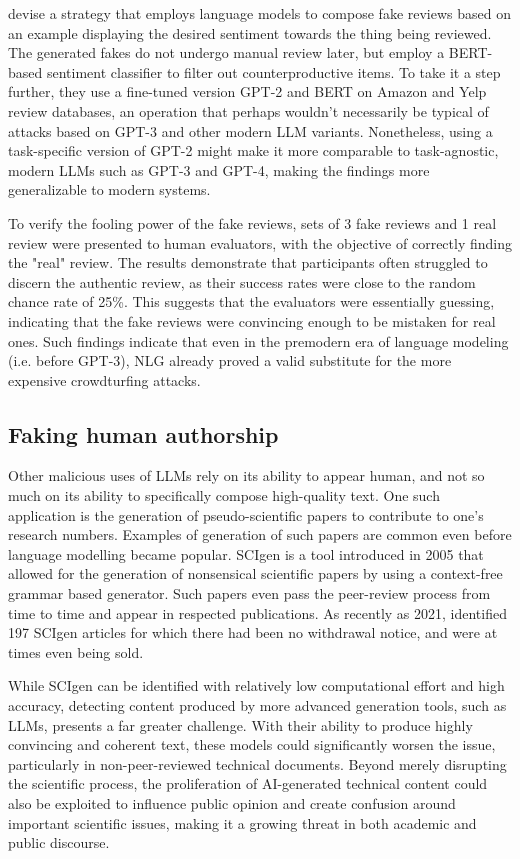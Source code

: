\citet{adelani2019reviews} devise a strategy that employs language models to compose fake reviews based on an example displaying the desired sentiment towards the thing being reviewed.
The generated fakes do not undergo manual review later, but employ a BERT-based sentiment classifier to filter out counterproductive items.
To take it a step further, they use a fine-tuned version GPT-2 and BERT on Amazon and Yelp review databases, an operation that perhaps wouldn't necessarily be typical of attacks based on GPT-3 and other modern LLM variants.
Nonetheless, using a task-specific version of GPT-2 might make it more comparable to task-agnostic, modern LLMs such as GPT-3 and GPT-4, making the findings more generalizable to modern systems.

To verify the fooling power of the fake reviews, sets of 3 fake reviews and 1 real review were presented to human evaluators, with the objective of correctly finding the "real" review.
The results demonstrate that participants often struggled to discern the authentic review, as their success rates were close to the random chance rate of 25\%.
This suggests that the evaluators were essentially guessing, indicating that the fake reviews were convincing enough to be mistaken for real ones.
Such findings indicate that even in the premodern era of language modeling (i.e. before GPT-3), NLG already proved a valid substitute for the more expensive crowdturfing attacks.

\subsection{Faking human authorship}

Other malicious uses of LLMs rely on its ability to appear human, and not so much on its ability to specifically compose high-quality text.
One such application is the generation of pseudo-scientific papers to contribute to one's research numbers.
Examples of generation of such papers are common even before language modelling became popular.
SCIgen \citep{hargrave2005scigen} is a tool introduced in 2005 that allowed for the generation of nonsensical scientific papers by using a context-free grammar based generator.
Such papers even pass the peer-review process from time to time and appear in respected publications.
As recently as 2021, \citet{cabanac2021prevalence} identified 197 SCIgen articles for which there had been no withdrawal notice, and were at times even being sold.

While SCIgen can be identified with relatively low computational effort and high accuracy, detecting content produced by more advanced generation tools, such as LLMs, presents a far greater challenge.
With their ability to produce highly convincing and coherent text, these models could significantly worsen the issue, particularly in non-peer-reviewed technical documents.
Beyond merely disrupting the scientific process, the proliferation of AI-generated technical content could also be exploited to influence public opinion and create confusion around important scientific issues, making it a growing threat in both academic and public discourse.

